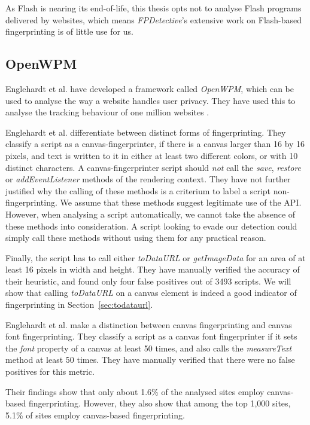\documentclass[
    fontsize=12pt,
    headings=small,
    parskip=half,
    bibliography=totoc,
    numbers=noenddot,
    open=any
    ]{scrreprt}
\begin{document}
As Flash is nearing its end-of-life, this thesis opts not to analyse Flash programs
delivered by websites, which means \textit{FPDetective}'s extensive work on Flash-based fingerprinting
is of little use for us.


\subsection{OpenWPM}
\label{section:openwpm}
Englehardt et al. have developed a framework called \textit{OpenWPM}, which can be used to analyse the way a website
handles user privacy. They have used this to analyse the tracking behaviour of one million websites
\cite{DBLP:conf/ccs/EnglehardtN16,englehardt2016census}.

Englehardt et al. differentiate between distinct forms of fingerprinting.
They classify a script as a canvas-fingerprinter, if there is a canvas larger than 16 by 16 pixels, and text is
written to it in either at least two different colors, or with 10 distinct characters.
A canvas-fingerprinter script should \textit{not} call the \textit{save}, \textit{restore} or \textit{addEventListener}
methods of the rendering context.
They have not further justified why the calling of these methods is a criterium to label a script non-fingerprinting.
We assume that these methods suggest legitimate use of the API. However, when analysing a script automatically,
we cannot take the absence of these methods into consideration. A script looking to evade our detection
could simply call these methods without using them for any practical reason.

Finally, the script has to call either \textit{toDataURL}
or \textit{getImageData} for an area of at least 16 pixels in width and height.
They have manually verified the accuracy of their heuristic, and found only four false positives
out of 3493 scripts.
We will show that calling \textit{toDataURL} on a canvas element is indeed a good indicator of fingerprinting
in Section~\ref{sec:todataurl}.

Englehardt et al. make a distinction between canvas fingerprinting and canvas font fingerprinting.
They classify a script as a canvas font fingerprinter if it sets the \textit{font} property
of a canvas at least 50 times, and also calls the \textit{measureText} method at least 50 times.
They have manually verified that there were no false positives for this metric.

Their findings show that only about 1.6\% of the analysed sites
employ canvas-based fingerprinting. However, they also show that among the top 1,000 sites,
5.1\% of sites employ canvas-based fingerprinting.
\end{document}
